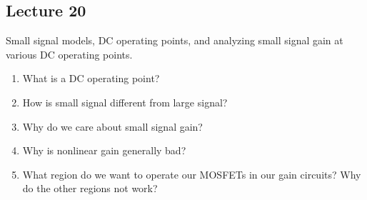 \subsection*{Lecture 20}

Small signal models, DC operating points, and analyzing small signal
gain at various DC operating points.

\begin{enumerate}
  \item What is a DC operating point?
  \item How is small signal different from large signal?
  \item Why do we care about small signal gain?
  \item Why is nonlinear gain generally bad?
  \item What region do we want to operate our MOSFETs in our gain circuits?
  Why do the other regions not work?
\end{enumerate}